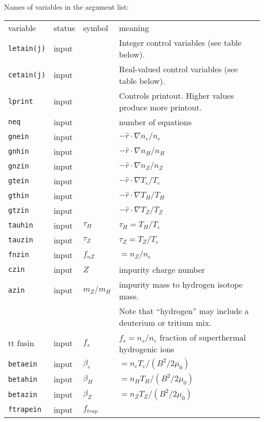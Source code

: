 \newpage
\renewcommand{\arraystretch}{1.0}
\begin{center}
Names of variables in the argument list:
\begin{tabular}{lllp{3.0in}}
variable & status & symbol & meaning \\
{\tt letain(j)} & input & & Integer control variables
                            (see table below).\\
{\tt cetain(j)} & input & & Real-valued control variables
                            (see table below).\\
{\tt lprint}    & input & & Controls printout. 
 Higher values produce more printout. \\
{\tt neq} & input & & number of equations \\
{\tt gnein} & input & $  $ 
    & $ - \hat{r} \cdot \nabla n_e / n_e $ \\
{\tt gnhin} & input & $  $
    & $ - \hat{r} \cdot \nabla n_H / n_H $ \\
{\tt gnzin} & input & $  $
    & $ - \hat{r} \cdot \nabla n_Z / n_Z $ \\
{\tt gtein} & input & $  $
    & $ - \hat{r} \cdot \nabla T_e / T_e $ \\
{\tt gthin} & input & $  $
    & $ - \hat{r} \cdot \nabla T_H / T_H $ \\
{\tt gtzin} & input & $  $
    & $ - \hat{r} \cdot \nabla T_Z / T_Z $ \\
{\tt tauhin} & input & $\tau_H$ & $ \tau_H = T_H / T_e $ \\
{\tt tauzin} & input & $\tau_Z$ & $ \tau_Z = T_Z / T_e $ \\
{\tt fnzin} & input & $ f_{nZ} $ & $ = n_Z / n_e $ \\
{\tt czin}  & input & $ Z $ & impurity charge number \\
{\tt azin}  & input & $ m_Z / m_H $
     & impurity mass to hydrogen isotope mass. \\
 & & & Note that ``hydrogen'' may include a deuterium or tritium mix. \\
{tt fnsin}  & input & $ f_s $
  & $ f_s = n_s / n_e $ fraction of superthermal hydrogenic ions \\
{\tt betaein} & input & $\beta_e$ &
     $ = n_e T_e / ( B^2 / 2 \mu_0 ) $ \\
{\tt betahin} & input & $\beta_H$ &
     $ = n_H T_H / ( B^2 / 2 \mu_0 ) $ \\
{\tt betazin} & input & $\beta_Z$ &
     $ = n_Z T_Z / ( B^2 / 2 \mu_0 ) $ \\
{\tt ftrapein}  & input & $f_{trap} $ &

\end{tabular}
\end{center}
